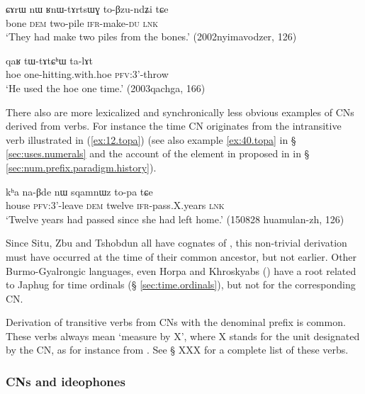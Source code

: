 \begin{exe}
\ex \label{ex:RnWtArtsWG}
\gll ɕɤrɯ nɯ ʁnɯ-tɤrtsɯɣ to-βzu-ndʑi tɕe \\
bone \textsc{dem} two-pile \textsc{ifr}-make-\textsc{du} \textsc{lnk} \\
\glt `They had make two piles from the bones.' (2002nyimavodzer, 126)
\end{exe}

\begin{exe}
\ex \label{ex:tWtAtChW}
\gll qaʁ tɯ-tɤtɕʰɯ ta-lɤt  \\
hoe one-hitting.with.hoe \textsc{pfv}:3'-throw \\
\glt `He used the hoe one time.' (2003qachga, 166)
\end{exe}

There also are more lexicalized and synchronically less obvious examples of CNs derived from verbs. For instance the time CN  originates from the intransitive verb   illustrated in (\ref{ex:12.topa}) (see also example \ref{ex:40.topa}  in 
§ \ref {sec:uses.numerals} and the account of the  element in  proposed in in § \ref{sec:num.prefix.paradigm.history}). 

\begin{exe}
\ex \label{ex:12.topa} 
\gll kʰa na-βde nɯ sqamnɯz to-pa tɕe \\ 
house \textsc{pfv}:3'-leave \textsc{dem} twelve  \textsc{ifr}-pass.X.years \textsc{lnk} \\
\glt `Twelve years had passed since she had left home.' (150828 huamulan-zh, 126)
\end{exe}

Since Situ, Zbu and Tshobdun all have cognates of , this non-trivial derivation must have occurred at the time of their common ancestor, but not earlier. Other Burmo-Gyalrongic languages, even Horpa and Khroskyabs (\citealt{jacques17stau}) have a root related to Japhug  for time ordinals (§ \ref{sec:time.ordinals}), but not for the corresponding CN. 
 
 
Derivation of transitive verbs from CNs with the denominal prefix  is common. These verbs always mean `measure by X', where X stands for the unit designated by the CN, as for instance  from . See § XXX for a complete list of these verbs.
 
\subsubsection{CNs and ideophones}   \label{sec:CN.ideophones}


